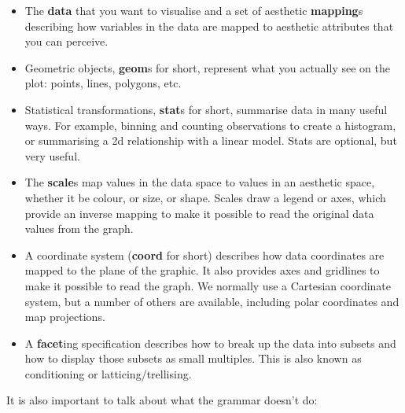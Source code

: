 \begin{itemize}
  \item The \textbf{data} that you want to visualise and a set of aesthetic \textbf{mapping}s describing how variables in the data are mapped to aesthetic attributes that you can perceive.

  \item Geometric objects, \textbf{geom}s for short, represent what you actually see on the plot: points, lines, polygons, etc.

  \item Statistical transformations, \textbf{stat}s for short, summarise data in many useful ways.  For example, binning and counting observations to create a histogram, or summarising a 2d relationship with a linear model.  Stats are optional, but very useful.

  \item The \textbf{scale}s map values in the data space to values in an aesthetic space, whether it be colour, or size, or shape.  Scales draw a legend or axes, which provide an inverse mapping to make it possible to read the original data values from the graph.

  \item A coordinate system (\textbf{coord} for short) describes how data coordinates are mapped to the plane of the graphic.  It also provides axes and gridlines to make it possible to read the graph.  We normally use a Cartesian coordinate system, but a number of others are available, including polar coordinates and map projections.

  \item A \textbf{facet}ing specification describes how to break up the data into subsets and how to display those subsets as small multiples.  This is also known as conditioning or latticing/trellising.

\end{itemize}

It is also important to talk about what the grammar doesn't do:

